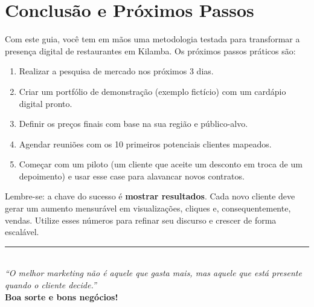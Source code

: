 \documentclass[a4paper,12pt]{article}
\begin{document}
\begin{center}
\end{center}

\section{Conclusão e Próximos Passos}
Com este guia, você tem em mãos uma metodologia testada para transformar a presença digital de restaurantes em Kilamba. Os próximos passos práticos são:
\begin{enumerate}
    \item Realizar a pesquisa de mercado nos próximos 3 dias.
    \item Criar um portfólio de demonstração (exemplo fictício) com um cardápio digital pronto.
    \item Definir os preços finais com base na sua região e público-alvo.
    \item Agendar reuniões com os 10 primeiros potenciais clientes mapeados.
    \item Começar com um piloto (um cliente que aceite um desconto em troca de um depoimento) e usar esse case para alavancar novos contratos.
\end{enumerate}

Lembre-se: a chave do sucesso é \textbf{mostrar resultados}. Cada novo cliente deve gerar um aumento mensurável em visualizações, cliques e, consequentemente, vendas. Utilize esses números para refinar seu discurso e crescer de forma escalável.

\begin{center}
    \rule{0.7\textwidth}{0.4pt}\\
    \textit{“O melhor marketing não é aquele que gasta mais, mas aquele que está presente quando o cliente decide.”}\\
    \textbf{Boa sorte e bons negócios!}
\end{center}
\end{document}
